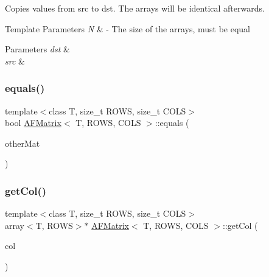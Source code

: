 Copies values from {\ttfamily src} to {\ttfamily dst}. The arrays will be identical afterwards. 
\begin{DoxyTemplParams}{Template Parameters}
{\em N} & -\/ The size of the arrays, must be equal \\
\hline
\end{DoxyTemplParams}

\begin{DoxyParams}{Parameters}
{\em dst} & \\
\hline
{\em src} & \\
\hline
\end{DoxyParams}
\mbox{\label{class_a_f_matrix_ab0187dbba61ef71f91e6b4365924ffe3}} 
\subsubsection{\texorpdfstring{equals()}{equals()}}
{\footnotesize\ttfamily template$<$class T, size\+\_\+t R\+O\+WS, size\+\_\+t C\+O\+LS$>$ \\
bool \hyperlink{class_a_f_matrix}{A\+F\+Matrix}$<$ T, R\+O\+WS, C\+O\+LS $>$\+::equals (\begin{DoxyParamCaption}\item[{\hyperlink{class_a_f_matrix}{A\+F\+Matrix}$<$ T, R\+O\+WS, C\+O\+LS $>$ $\ast$}]{other\+Mat }\end{DoxyParamCaption})\hspace{0.3cm}{\ttfamily [inline]}}

\mbox{\label{class_a_f_matrix_ae6de9932dfad5cd7d4ad9887907155cb}} 
\subsubsection{\texorpdfstring{get\+Col()}{getCol()}}
{\footnotesize\ttfamily template$<$class T, size\+\_\+t R\+O\+WS, size\+\_\+t C\+O\+LS$>$ \\
array$<$T, R\+O\+WS$>$$\ast$ \hyperlink{class_a_f_matrix}{A\+F\+Matrix}$<$ T, R\+O\+WS, C\+O\+LS $>$\+::get\+Col (\begin{DoxyParamCaption}\item[{int}]{col }\end{DoxyParamCaption})\hspace{0.3cm}{\ttfamily [inline]}}



